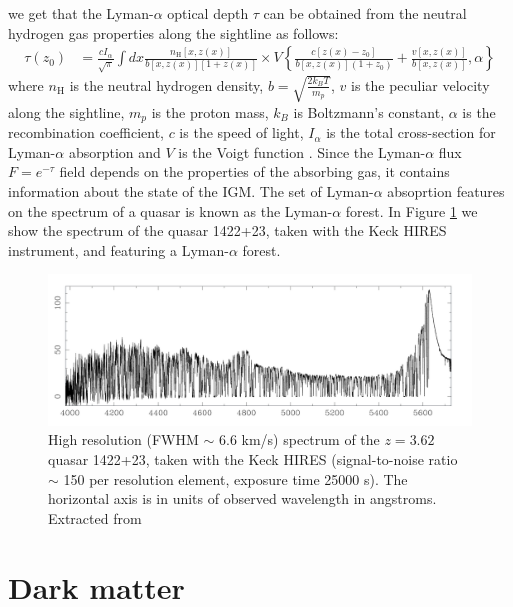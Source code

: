we get that the Lyman-$\alpha$ optical depth $\tau$ can be obtained from the neutral hydrogen gas properties along the sightline as follows:
\begin{equation}\label{eq:lyman opacity}
    \begin{aligned}\tau(z_0)&=\frac{cI_\alpha}{\sqrt{\pi}}\int dx\frac{n_{\mathrm{H}}[x,z(x)]}{b[x,z(x)][1+z(x)]}\times V\left\{\frac{c[z(x)-z_0]}{b[x,z(x)](1+z_0)}+\frac{v[x,z(x)]}{b[x,z(x)]},\alpha\right\}\end{aligned}
\end{equation} 
where $n_\text{H}$ is the neutral hydrogen density, $b=\sqrt{\frac{2k_BT}{m_p}}$, $v$ is the peculiar velocity along the sightline, $m_p$ is the proton mass, $k_B$ is Boltzmann's constant, $\alpha$ is the recombination coefficient, $c$ is the speed of light, $I_\alpha$ is the total cross-section for Lyman-$\alpha$ absorption and $V$ is the Voigt function \cite{Choudhury_2001}. Since the Lyman-$\alpha$ flux $F=e^{-\tau}$ field depends on the properties of the absorbing gas, it contains information about the state of the IGM. The set of Lyman-$\alpha$ absoprtion features on the spectrum of a quasar is known as the Lyman-$\alpha$ forest. In Figure \ref{fig:forest} we show the spectrum of the quasar 1422+23, taken with the Keck HIRES instrument, and featuring a Lyman-$\alpha$ forest.

\begin{figure}[ht]
    \centering
    \includegraphics[width=1\linewidth]{img/ML/forest.png}
    \caption{High resolution (FWHM $\sim$ 6.6 km/s) spectrum of the $z = 3.62$ quasar 1422+23, taken with the Keck HIRES (signal-to-noise ratio $\sim$ 150 per resolution element, exposure time 25000 s). The horizontal axis is in units of observed wavelength in angstroms. Extracted from \cite{Rauch_1998}}
    \label{fig:forest}
\end{figure}

\section{Dark matter}\label{sec:DM}

